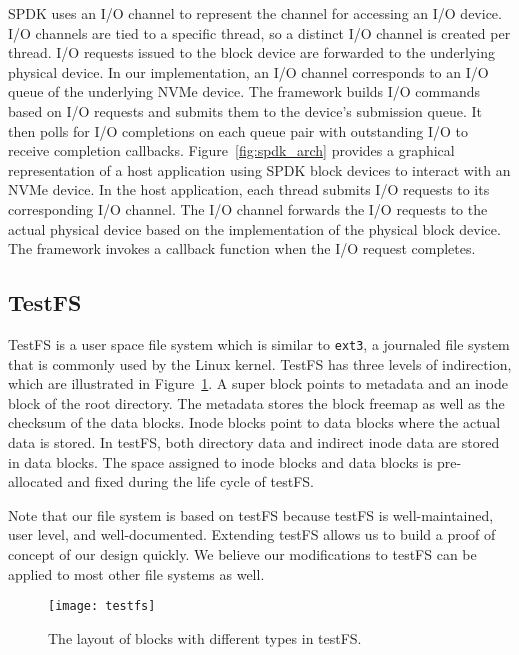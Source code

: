 SPDK uses an I/O channel to represent the channel for accessing an I/O device.
I/O channels are tied to a specific thread, so a distinct I/O channel is
created per thread. I/O requests issued to the block device are forwarded to
the underlying physical device. In our implementation, an I/O channel
corresponds to an I/O queue of the underlying NVMe device. The framework builds
I/O commands based on I/O requests and submits them to the device's submission
queue. It then polls for I/O completions on each queue pair with outstanding
I/O to receive completion callbacks. Figure~\ref{fig:spdk_arch} provides a
graphical representation of a host application using SPDK block devices to
interact with an NVMe device. In the host application, each thread submits I/O
requests to its corresponding I/O channel. The I/O channel forwards the I/O
requests to the actual physical device based on the implementation of the
physical block device. The framework invokes a callback function when the I/O
request completes.

\subsection{TestFS}

TestFS\cite{testfs} is a user space file system which is similar to {\tt ext3},
a journaled file system that is commonly used by the Linux kernel. TestFS has
three levels of indirection, which are illustrated in Figure~\ref{fig:testfs}.
A super block points to metadata and an inode block of the root directory.  The
metadata stores the block freemap as well as the checksum of the data blocks.
Inode blocks point to data blocks where the actual data is stored. In testFS,
both directory data and indirect inode data are stored in data blocks. The
space assigned to inode blocks and data blocks is pre-allocated and fixed
during the life cycle of testFS.

Note that our file system is based on testFS because testFS is well-maintained,
user level, and well-documented. Extending testFS allows us to build a proof of
concept of our design quickly. We believe our modifications to testFS can be
applied to most other file systems as well.

\begin{figure}[h!]
  \centering
  \texttt{[image: testfs]}
  \caption{The layout of blocks with different types in testFS.}
  \label{fig:testfs}
\end{figure}
